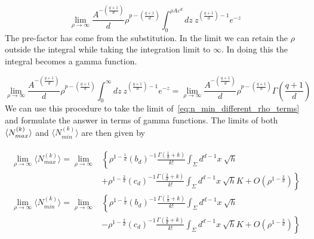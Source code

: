\documentclass[12pt]{article}
\newcommand{\be}{\begin{equation}}
\newcommand{\ee}{\end{equation}}
\begin{document}
\be\label{eq:incomplete_gamma_function}
\lim_{\rho\rightarrow\infty}\frac{A^{-\left(\frac{q+1}{d} \right)}}{d}\rho^{p-\left(\frac{q+1}{d} \right)}\int_{0}^{\rho A \varepsilon^d}dz\
z^{\left(\frac{q+1}{d} \right)-1}e^{-z}
\ee
The pre-factor has come from the substitution. In the limit we can retain the $\rho$ outside the integral while taking the integration limit to $\infty$. In doing this the integral becomes a gamma function.

\be\label{eq:gamma_function}
\lim_{\rho\rightarrow\infty}\frac{A^{-\left(\frac{q+1}{d} \right)}}{d}\rho^{p-\left(\frac{q+1}{d} \right)}\int_{0}^{\infty}dz\
z^{\left(\frac{q+1}{d} \right)-1}e^{-z}=\lim_{\rho\rightarrow\infty}
\frac{A^{-\left(\frac{q+1}{d} \right)}}{d}\rho^{p-\left(\frac{q+1}{d} \right)}\Gamma\left( \frac{q+1}{d} \right)
\ee
We can use this procedure to take the limit of~\eqref{eq:n_min_different_rho_terms} and formulate the answer in terms of gamma functions. The limits of both $\langle N_{\vphantom{i}max}^{(k)}\rangle$ and $\langle N_{min}^{(k)}\rangle$ are then given by

\begin{gather}\label{eq:nmax_nmin_final}
\begin{aligned}
\lim_{\rho\rightarrow\infty}\langle N_{max}^{(k)}\rangle = \lim_{\rho\rightarrow\infty} & \left\lbrace \rho^{1-\frac{1}{d}} \left(b_d\right)^{-1} \frac{\Gamma\left(\frac{1}{d}+k\right)}{k!}
\int_{\Sigma}d^{d-1}x\: \sqrt{h} \right.
 \\
 &  \left. +\rho^{1-\frac{2}{d}} \left(c_d\right)^{-1} \frac{\Gamma\left(\frac{2}{d}+k\right)}{k!}
\int_{\Sigma}d^{d-1}x\: \sqrt{h}K + O\left(\rho^{1-\frac{3}{d}} \right) \right\rbrace
\\
\lim_{\rho\rightarrow\infty}\langle N_{min}^{(k)}\rangle = \lim_{\rho\rightarrow\infty} & \left\lbrace \rho^{1-\frac{1}{d}} \left(b_d\right)^{-1} \frac{\Gamma\left(\frac{1}{d}+k\right)}{k!}
\int_{\Sigma}d^{d-1}x\: \sqrt{h} \right.
 \\
 &  \left. -\rho^{1-\frac{2}{d}} \left(c_d\right)^{-1} \frac{\Gamma\left(\frac{2}{d}+k\right)}{k!}
\int_{\Sigma}d^{d-1}x\: \sqrt{h}K + O\left(\rho^{1-\frac{3}{d}} \right) \right\rbrace
\\
\end{aligned}
\end{gather}
\end{document}
